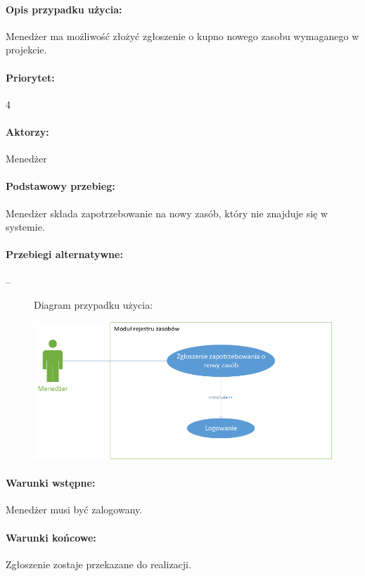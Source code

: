 \documentclass[11pt, a4paper, oneside]{report}
\begin{document}
\paragraph{Opis przypadku użycia:} Menedżer ma możliwość złożyć zgłoszenie o kupno nowego zasobu wymaganego w projekcie. 
\paragraph{Priorytet:} 4
\paragraph{Aktorzy:} Menedżer
\paragraph{Podstawowy przebieg:}
Menedżer składa zapotrzebowanie na nowy zasób, który nie znajduje się w systemie.
\paragraph{Przebiegi alternatywne:}

--

\begin{figure}[H]
Diagram przypadku użycia:

\centering
\includegraphics[scale=0.8]{nowy_zasob_menedzer_techniczny.png}
\end{figure}

\paragraph{Warunki wstępne:} Menedżer musi być zalogowany.
\paragraph{Warunki końcowe:} Zgłoszenie zostaje przekazane do realizacji.
\end{document}

